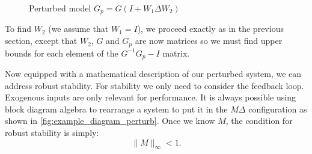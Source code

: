 \documentclass[12pt,lot, lof]{puthesis}
\begin{document}
\begin{figure}[htbp]
	\centering

	\caption{Perturbed model $G_p = G (I + W_1 \Delta W_2)$}
	\label{fig:example_perturbed_MIMO}
\end{figure}

To find $W_2$ (we assume that $W_1 = I$), we proceed exactly as in the previous section, except that $W_2$, $G$ and $G_p$ are now matrices so we must find upper bounds for each element of the $G^{-1}{G_p} - I$ matrix.


Now equipped with a mathematical description of our perturbed system, we can address robust stability.
For stability we only need to consider the feedback loop. Exogenous inputs are only relevant for performance.
It is always possible using block diagram algebra to rearrange a system to put it in the $M \Delta$ configuration as shown in \ref{fig:example_diagram_perturb}.
Once we know $M$, the condition for robust stability is simply:
\begin{equation}
	\| M \|_\infty < 1.
\end{equation}
\end{document}
